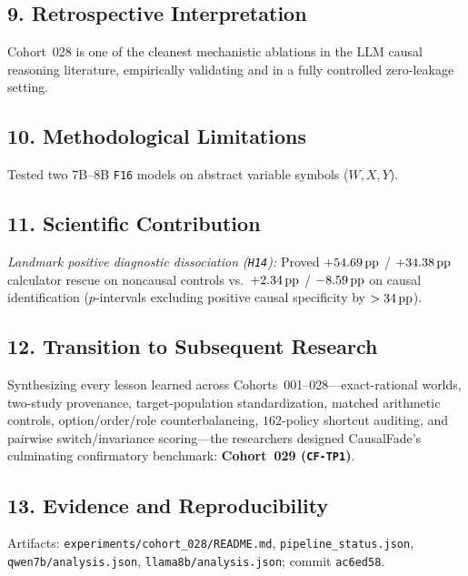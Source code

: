 \subsection*{9. Retrospective Interpretation}
Cohort~028 is one of the cleanest mechanistic ablations in the LLM causal reasoning literature, empirically validating \citet{sawarni2026crb} and \citet{leban2026causalds} in a fully controlled zero-leakage setting.

\subsection*{10. Methodological Limitations}
Tested two 7B--8B \texttt{F16} models on abstract variable symbols ($W, X, Y$).

\subsection*{11. Scientific Contribution}
\emph{Landmark positive diagnostic dissociation (\texttt{H14}):} Proved $+54.69\,\mathrm{pp}$ / $+34.38\,\mathrm{pp}$ calculator rescue on noncausal controls vs.\ $+2.34\,\mathrm{pp}$ / $-8.59\,\mathrm{pp}$ on causal identification ($p$-intervals excluding positive causal specificity by $>34\,\mathrm{pp}$).

\subsection*{12. Transition to Subsequent Research}
Synthesizing every lesson learned across Cohorts~001--028---exact-rational worlds, two-study provenance, target-population standardization, matched arithmetic controls, option/order/role counterbalancing, $162$-policy shortcut auditing, and pairwise switch/invariance scoring---the researchers designed CausalFade's culminating confirmatory benchmark: \textbf{Cohort~029 (\texttt{CF-TP1})}.

\subsection*{13. Evidence and Reproducibility}
Artifacts: \texttt{experiments/cohort\_028/README.md}, \texttt{pipeline\_status.json}, \texttt{qwen7b/analysis.json}, \texttt{llama8b/analysis.json}; commit \texttt{ac6ed58}.
